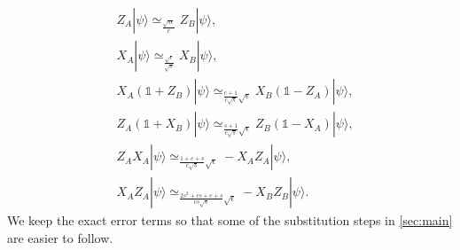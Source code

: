 \documentclass[11pt,letterpaper]{article}
\newcommand{\ket}[1]{|#1\rangle}
\newcommand{\1}{\mathbb{1}}
\newcommand{\se}{\sqrt{\epsilon}}
\newcommand{\appd}[1]{\simeq_{#1}}
\theoremstyle{definition}
\begin{document}
\begin{align}
\label{eq:za-zb}& Z_A\ket{\psi} \appd{\frac{\sqrt{s\epsilon}}{c}} Z_B\ket{\psi},\\
	\label{eq:xa-xb}&X_A\ket{\psi} \appd{\frac{\sqrt{\epsilon}}{\sqrt{s}}} X_B \ket{\psi}, \\
	\label{eq:xazb}&X_A(\1+Z_B)\ket{\psi} \appd{\frac{c+1}{c\sqrt{s}} \se} X_B(\1-Z_A) \ket{\psi},\\
	\label{eq:zaxb}&Z_A(\1+X_B)\ket{\psi} \appd{ \frac{s+1}{c\sqrt{s}} \se} Z_B(\1-X_A) \ket{\psi},\\
	\label{eq:zaxa}&Z_AX_A\ket{\psi} \appd{\frac{1+c+s}{c\sqrt{s}} \se} -X_AZ_A \ket{\psi},\\
	\label{eq:zaxaxbzb}&X_AZ_A \ket{\psi} \appd{\frac{2s^2+cs+c+s}{cs\sqrt{s}} \sqrt{\epsilon}} -X_BZ_B \ket{\psi}.
\end{align}
We keep the exact error terms so that some
of the substitution steps in \cref{sec:main} are 
easier to follow.

\end{document}

